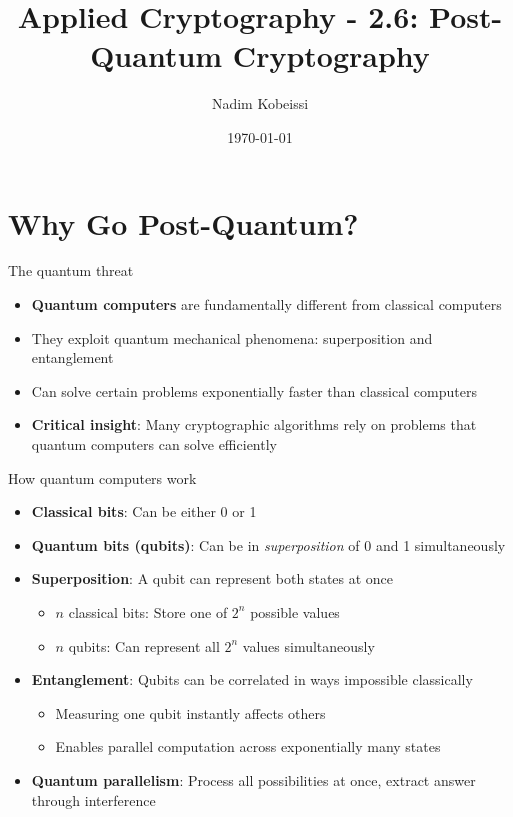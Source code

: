 \documentclass[aspectratio=169, lualatex, handout]{beamer}
\title{Applied Cryptography - 2.6: Post-Quantum Cryptography}
\author{Nadim Kobeissi}
\institute{American University of Beirut}
\date{\today}
\begin{document}
\begin{frame}[plain]
	\titlepage
\end{frame}

\section{Why Go Post-Quantum?}

\begin{frame}{The quantum threat}
	\begin{itemize}
		\item \textbf{Quantum computers} are fundamentally different from classical computers
		\item They exploit quantum mechanical phenomena: superposition and entanglement
		\item Can solve certain problems exponentially faster than classical computers
		\item \textbf{Critical insight}: Many cryptographic algorithms rely on problems that quantum computers can solve efficiently
	\end{itemize}
\end{frame}

\begin{frame}{How quantum computers work}
	\begin{itemize}
		\item \textbf{Classical bits}: Can be either 0 or 1
		\item \textbf{Quantum bits (qubits)}: Can be in \textit{superposition} of 0 and 1 simultaneously
		\item \textbf{Superposition}: A qubit can represent both states at once
		      \begin{itemize}
			      \item $n$ classical bits: Store one of $2^n$ possible values
			      \item $n$ qubits: Can represent all $2^n$ values simultaneously
		      \end{itemize}
		\item \textbf{Entanglement}: Qubits can be correlated in ways impossible classically
		      \begin{itemize}
			      \item Measuring one qubit instantly affects others
			      \item Enables parallel computation across exponentially many states
		      \end{itemize}
		\item \textbf{Quantum parallelism}: Process all possibilities at once, extract answer through interference
	\end{itemize}
\end{frame}
\end{document}
